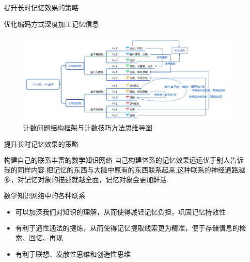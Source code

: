 \documentclass[serif]{beamer}
\begin{document}
        \begin{frame}{提升长时记忆效果的策略}
        \begin{block}{优化编码方式深度加工记忆信息}
        	\begin{figure}
        		\includegraphics[scale=0.33]{combination.png}
        		\caption{计数问题结构框架与计数技巧方法思维导图}
        	\end{figure}
        \end{block}
        \end{frame}
        
        \begin{frame}{提升长时记忆效果的策略}
           \begin{block}{构建自己的联系丰富的数学知识网络}
           自己构建体系的记忆效果远远优于别人告诉我的同样内容.把记忆的东西与大脑中原有的东西联系起来,这种联系的神经通路越多，对记忆对象的描述就越全面，记忆对象会更加鲜活.	
           \end{block}
           \pause
           数学知识网络中的各种联系
           \begin{itemize}
           	\item 可以加深我们对知识的理解，从而使得减轻记忆负担，巩固记忆持效性 
           	\item 有利于通性通法的提炼，从而使得记忆提取线索更为精准，便于存储信息的检索、回忆、再现
           	\item 有利于联想、发散性思维和创造性思维
           \end{itemize}
        \end{frame}
        
\end{document}
